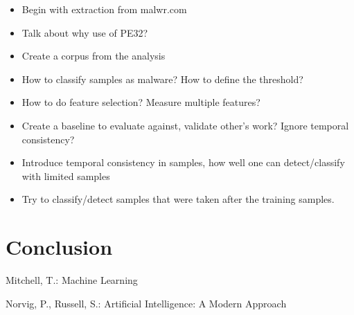 \documentclass{llncs}
\begin{document}
\begin{itemize}
	\item Begin with extraction from malwr.com
	\item Talk about why use of PE32?
	\item Create a corpus from the analysis
	\item How to classify samples as malware? How to define the threshold?
	\item How to do feature selection? Measure multiple features?
	\item Create a baseline to evaluate against, validate other's work? Ignore temporal consistency?
	\item Introduce temporal consistency in samples, how well one can detect/classify with limited samples
	\item Try to classify/detect samples that were taken after the training samples.
\end{itemize}



\section{Conclusion}\label{sec:conclusion}


\begin{thebibliography}{}

Mitchell, T.:
Machine Learning

Norvig, P., Russell, S.:
Artificial Intelligence: A Modern Approach


\end{thebibliography}
\end{document}

